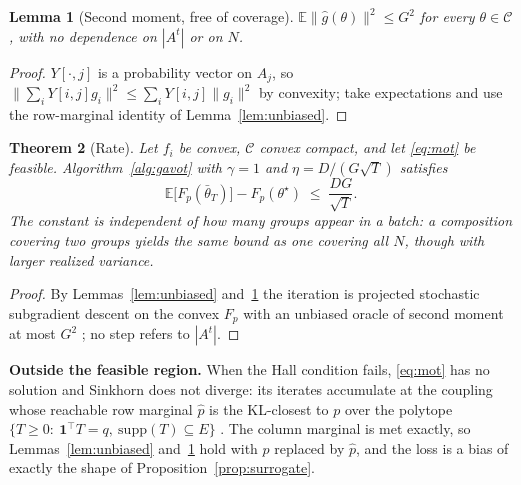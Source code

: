\documentclass{article}
\newtheorem{theorem}{Theorem}
\newtheorem{lemma}[theorem]{Lemma}
\theoremstyle{definition}
\newcommand{\E}{\mathbb{E}}
\begin{document}
\begin{lemma}[Second moment, free of coverage]
\label{lem:variance}
$\E\|\hat g(\theta)\|^2\le G^2$ for every $\theta\in\mathcal{C}$, with no
dependence on $|A^t|$ or on $N$.
\end{lemma}
\begin{proof}
$Y[\cdot,j]$ is a probability vector on $A_j$, so
$\|\sum_i Y[i,j]g_i\|^2\le\sum_i Y[i,j]\|g_i\|^2$ by convexity; take
expectations and use the row-marginal identity of Lemma~\ref{lem:unbiased}.
\end{proof}

\begin{theorem}[Rate]
\label{thm:rate}
Let $f_i$ be convex, $\mathcal{C}$ convex compact, and let \eqref{eq:mot} be
feasible. Algorithm~\ref{alg:gavot} with $\gamma=1$ and
$\eta=D/(G\sqrt{T})$ satisfies
\begin{equation}
\E\big[F_p(\bar\theta_T)\big]-F_p(\theta^\star)\;\le\;\frac{DG}{\sqrt{T}} .
\end{equation}
The constant is independent of how many groups appear in a batch: a composition
covering two groups yields the same bound as one covering all $N$, though with
larger realized variance.
\end{theorem}
\begin{proof}
By Lemmas~\ref{lem:unbiased} and~\ref{lem:variance} the iteration is projected
stochastic subgradient descent on the convex $F_p$ with an unbiased oracle of
second moment at most $G^2$ \cite{nemirovski2009}; no step refers to $|A^t|$.
\end{proof}

\noindent\textbf{Outside the feasible region.}
When the Hall condition fails, \eqref{eq:mot} has no solution and Sinkhorn does
not diverge: its iterates accumulate at the coupling whose reachable row
marginal $\hat p$ is the KL-closest to $p$ over the polytope
$\{T\ge 0:\ \mathbf{1}^\top T=q,\ \mathrm{supp}(T)\subseteq E\}$
\cite{csiszar1975,gietl2013ipfp,peyre2019}. The column marginal is met exactly, so
Lemmas~\ref{lem:unbiased} and~\ref{lem:variance} hold with $p$ replaced by
$\hat p$, and the loss is a bias of exactly the shape of
Proposition~\ref{prop:surrogate}.
\end{document}
